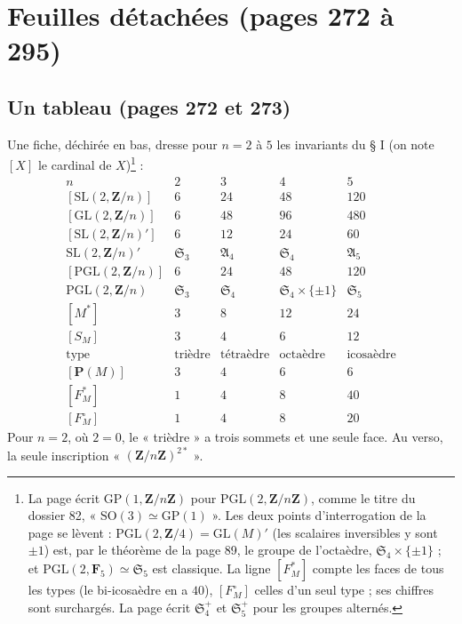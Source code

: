 \documentclass[11pt,a4paper]{article}
\begin{document}
\section*{Feuilles détachées (pages 272 à 295)}

\subsection*{Un tableau (pages 272 et 273)}

Une fiche, déchirée en bas, dresse pour $n = 2$ à $5$ les invariants du § I
(on note $[X]$ le cardinal de $X$)\footnote{La page écrit $\mathrm{GP}(1,
\mathbf{Z}/n\mathbf{Z})$ pour $\mathrm{PGL}(2, \mathbf{Z}/n\mathbf{Z})$, comme le
titre du dossier 82, « $\mathrm{SO}(3) \simeq \mathrm{GP}(1)$ ». Les deux points
d'interrogation de la page se lèvent : $\mathrm{PGL}(2, \mathbf{Z}/4) =
\mathrm{GL}(M)'$ (les scalaires inversibles y sont $\pm 1$) est, par le théorème
de la page 89, le groupe de l'octaèdre, $\mathfrak{S}_4 \times \{\pm 1\}$ ; et
$\mathrm{PGL}(2, \mathbf{F}_5) \simeq \mathfrak{S}_5$ est classique. La ligne
$[F_M^{*}]$ compte les faces de tous les types (le bi-icosaèdre en a $40$),
$[F_M^{\circ}]$ celles d'un seul type ; ses chiffres sont surchargés. La page écrit $\mathfrak{S}_4^{+}$ et $\mathfrak{S}_5^{+}$ pour les groupes alternés.} :
\[
\begin{array}{l|c|c|c|c}
  n & 2 & 3 & 4 & 5 \\ \hline
  [\mathrm{SL}(2, \mathbf{Z}/n)] & 6 & 24 & 48 & 120 \\
  {}[\mathrm{GL}(2, \mathbf{Z}/n)] & 6 & 48 & 96 & 480 \\
  {}[\mathrm{SL}(2, \mathbf{Z}/n)'] & 6 & 12 & 24 & 60 \\
  \mathrm{SL}(2, \mathbf{Z}/n)' & \mathfrak{S}_3 & \mathfrak{A}_4 &
    \mathfrak{S}_4 & \mathfrak{A}_5 \\
  {}[\mathrm{PGL}(2, \mathbf{Z}/n)] & 6 & 24 & 48 & 120 \\
  \mathrm{PGL}(2, \mathbf{Z}/n) & \mathfrak{S}_3 & \mathfrak{S}_4 &
    \mathfrak{S}_4 \times \{\pm 1\} & \mathfrak{S}_5 \\
  {}[M^{*}] & 3 & 8 & 12 & 24 \\
  {}[S_M] & 3 & 4 & 6 & 12 \\
  \text{type} & \text{trièdre} & \text{tétraèdre} & \text{octaèdre} &
    \text{icosaèdre} \\
  {}[\mathbf{P}(M)] & 3 & 4 & 6 & 6 \\
  {}[F_M^{*}] & 1 & 4 & 8 & 40 \\
  {}[F_M^{\circ}] & 1 & 4 & 8 & 20
\end{array}
\]
Pour $n = 2$, où $2 = 0$, le « trièdre » a trois sommets et une seule face. Au
verso, la seule inscription « $(\mathbf{Z}/n\mathbf{Z})^{2*}$ ».
\end{document}
